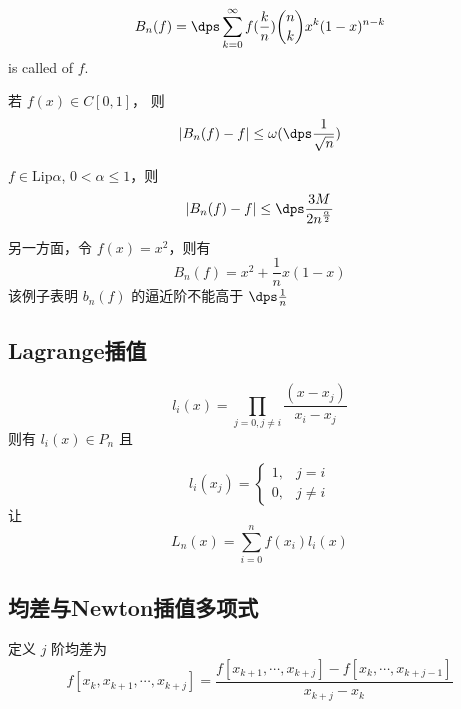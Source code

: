 \begin{definition}
    \[B_n(f)=\dps\sum_{k=0}^\infty f(\frac{k}{n})\binom{n}{k}x^k(1-x)^{n-k}\]
    is called   of  $ f $. 
\end{definition}
\begin{theorem}
    若 $ f(x)\in C[0,1] $， 则
    \[|B_n(f)-f| \leq \omega(\dps\frac{1}{\sqrt{n}})\] 
\end{theorem}
\begin{corollary}
    $ f\in \mathrm{Lip}\alpha $, $ 0<\alpha \leq 1 $，则
    \[|B_n(f)-f| \leq \dps\frac{3M}{2n^{\frac{\alpha}{2}}}\] 
\end{corollary}

另一方面，令 $ f(x)=x^2 $，则有
\[B_n(f)=x^2+\frac{1}{n}x(1-x)\]
该例子表明 $ b_n(f) $  的逼近阶不能高于 $ \dps\frac{1}{n} $ 

\subsection{Lagrange插值}
\[l_i(x)=\prod_{j=0,j\neq i}\frac{(x-x_j)}{x_i-x_j}\]
则有 $ l_i(x)\in P_n $ 且

\[l_i(x_j)=\begin{cases}
    1,&j=i\\
    0,&j\neq i
\end{cases}\]
让
\[L_n(x)=\sum_{i=0}^nf(x_i)l_i(x)\]
\subsection{均差与Newton插值多项式}
定义 $ j $ 阶均差为
\[f[x_k,x_{k+1},\cdots,x_{k+j}]=\frac{f[x_{k+1},\cdots,x_{k+j}]-f[x_k,\cdots,x_{k+j-1}]}{x_{k+j}-x_k}\]